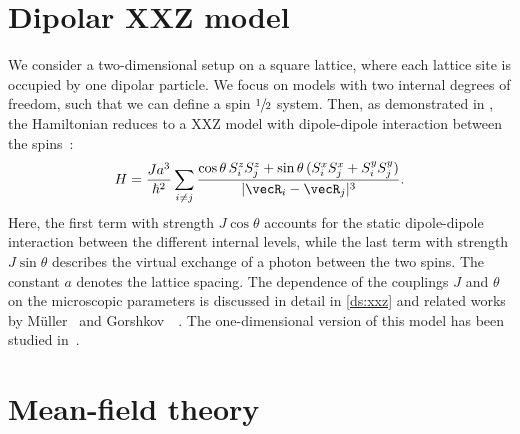 \section{Dipolar XXZ model}

We consider a two-dimensional setup on a square lattice, where each lattice site is occupied by one dipolar particle.
We focus on models with two internal degrees of freedom, such that we can define a spin $\sfrac{1}{2}$ system.
Then, as demonstrated in , the Hamiltonian reduces to a XXZ model with dipole-dipole interaction between the spins~\cite{Gorshkov2011,Muller2009}:
\begin{align}
H = \frac{J a^3}{\hbar^2} \sum_{i \neq j} \frac{\cos \theta \,
S^{z}_{i}S^{z}_{j}+ \sin \theta
\, ( S^{x}_{i} S^{x}_{j} + S^{y}_{i} S^{y}_{j} ) }{|\vecR_{i} - \vecR_{j}|^3}.
\end{align}
%
Here, the first term with strength $J \cos \theta$ accounts for the static dipole-dipole
interaction between the different internal levels, while the last term with strength $J \sin \theta$ describes the virtual exchange of a photon between the two spins.
The constant $a$ denotes the lattice spacing.
The dependence of the couplings $J$ and $\theta$ on the microscopic parameters is discussed in detail in \cref{ds:xxz} and related works by Müller~\cite{Muller2010} and Gorshkov~\etal~\cite{Gorshkov2011,Gorshkov2011c}.
The one-dimensional version of this model has been studied in~\cite{Hauke2010}.

\section{Mean-field theory}

